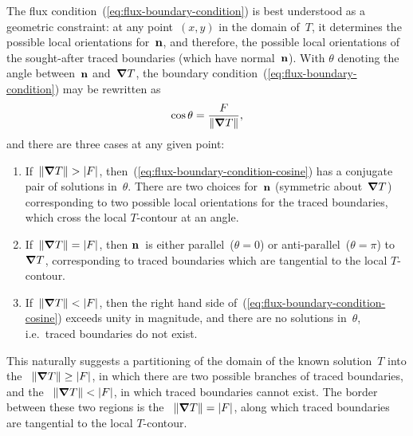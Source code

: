 The flux condition~(\ref{eq:flux-boundary-condition})
is best understood as a geometric constraint:
at any point~$(x, y)$ in the domain of~$T$,
it determines the possible local orientations for~$\mathop{}\!\boldsymbol{\mathbf{n}}$,
and therefore, the possible local orientations
of the sought-after traced boundaries
(which have normal~$\mathop{}\!\boldsymbol{\mathbf{n}}$).
With $\theta$ denoting the angle between~$\mathop{}\!\boldsymbol{\mathbf{n}}$ and~$\mathop{}\!\boldsymbol{\mathbf{\nabla}} T$,
the boundary condition~(\ref{eq:flux-boundary-condition}) may be rewritten as
\begin{equation}
  \cos\theta = \frac{F}{\lVert\mathop{}\!\boldsymbol{\mathbf{\nabla}} T\rVert},
  \label{eq:flux-boundary-condition-cosine}
\end{equation}
and there are three cases at any given point:
\begin{enumerate}
  \item
    If~$\lVert\mathop{}\!\boldsymbol{\mathbf{\nabla}} T\rVert > \lvert F\rvert$,
    then~(\ref{eq:flux-boundary-condition-cosine})
    has a conjugate pair of solutions in~$\theta$.
    There are two choices for~$\mathop{}\!\boldsymbol{\mathbf{n}}$
    (symmetric about~$\mathop{}\!\boldsymbol{\mathbf{\nabla}} T$)
    corresponding to two possible local orientations
    for the traced boundaries,
    which cross the local $T$-contour at an angle.
  \item
    If~$\lVert\mathop{}\!\boldsymbol{\mathbf{\nabla}} T\rVert = \lvert F\rvert$,
    then $\mathop{}\!\boldsymbol{\mathbf{n}}$~is either parallel~($\theta = 0$)
    or anti-parallel~($\theta = \pi$) to~$\mathop{}\!\boldsymbol{\mathbf{\nabla}} T$,
    corresponding to traced boundaries which are tangential
    to the local $T$-contour.
  \item
    If~$\lVert\mathop{}\!\boldsymbol{\mathbf{\nabla}} T\rVert < \lvert F\rvert$,
    then the right hand side of~(\ref{eq:flux-boundary-condition-cosine})
    exceeds unity in magnitude,
    and there are no solutions in~$\theta$,
    i.e.~traced boundaries do not exist.
\end{enumerate}
This naturally suggests a partitioning of
the domain of the known solution~$T$ into
the ~$\lVert\mathop{}\!\boldsymbol{\mathbf{\nabla}} T\rVert \ge \lvert F\rvert$,
in which there are two possible branches of traced boundaries,
and the ~$\lVert\mathop{}\!\boldsymbol{\mathbf{\nabla}} T\rVert < \lvert F\rvert$,
in which traced boundaries cannot exist.
The border between these two regions is
the ~$\lVert\mathop{}\!\boldsymbol{\mathbf{\nabla}} T\rVert = \lvert F\rvert$,
along which traced boundaries are tangential to the local $T$-contour.

